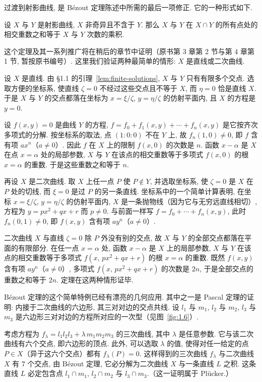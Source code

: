 过渡到射影曲线, 是 Bézout 定理陈述中所需的最后一项修正. 它的一种形式如下.

\begin{theorem}\label{thm:bezout-simple}
	设 $X$ 与 $Y$ 是射影曲线, $X$ 非奇异且不含于 $Y$. 那么 $X$ 与 $Y$ 在 $X \cap Y$ 的所有点处的相交重数之和等于 $X$ 与 $Y$ 次数的乘积.
\end{theorem}

这个定理及其一系列推广将在稍后的章节中证明（原书第 3 章第 2 节与第 4 章第 1 节, 暂按原书编号）. 这里我们验证两种最简单的情形: $X$ 是直线或二次曲线.

设 $X$ 是直线. 由 §1.1 的引理~\ref{lem:finite-solutions}, $X$ 与 $Y$ 只有有限多个交点. 选取方便的坐标系, 使直线 $\zeta = 0$ 不经过这些交点且不等于 $X$, 而 $\eta = 0$ 恰是直线 $X$. 于是 $X$ 与 $Y$ 的交点都落在坐标为 $x = \xi/\zeta$, $y = \eta/\zeta$ 的仿射平面内, 且 $X$ 的方程是 $y = 0$.

设 $f(x,y) = 0$ 是曲线 $Y$ 的方程, $f = f_0 + f_1(x,y) + \cdots + f_n(x,y)$ 是它按齐次多项式的分解. 按坐标系的取法, 点 $(1:0:0)$ 不在 $Y$ 上, 故 $f_n(1, 0) \ne 0$, 即 $f$ 含有项 $a x^n$（$a \ne 0$）. 因此 $f$ 在 $X$ 上的限制 $f(x, 0)$ 的次数是 $n$. 函数 $x - \alpha$ 是 $X$ 在点 $x = \alpha$ 处的局部参数, $X$ 与 $Y$ 在该点的相交重数等于多项式 $f(x, 0)$ 的根 $x = \alpha$ 的重数. 于是这些重数之和等于 $n$.

再设 $X$ 是二次曲线. 取 $X$ 上任一点 $P$ 使 $P \notin Y$, 并选取坐标系, 使 $\zeta = 0$ 是 $X$ 在 $P$ 处的切线, 而 $\xi = 0$ 是过 $P$ 的另一条直线. 坐标系中的一个简单计算表明, 在坐标 $x = \xi/\zeta$, $y = \eta/\zeta$ 的仿射平面内, $X$ 是一条抛物线（因为它与无穷远直线相切）, 方程为 $y = px^2 + qx + r$ 而 $p \ne 0$. 与前面一样写 $f = f_0 + \cdots + f_n(x,y)$, 此时 $f_n(0,1) \ne 0$, 即 $f(x,y)$ 含有项 $a y^n$（$a \ne 0$）.

二次曲线 $X$ 与直线 $\zeta = 0$ 除 $P$ 外没有别的交点, 故 $X$ 与 $Y$ 的全部交点都落在平面的有限部分. 在任一点 $x = \alpha$ 处, 函数 $x - \alpha$ 是 $X$ 上的局部参数, $X$ 与 $Y$ 在该点的相交重数等于多项式 $f(x,\, px^2 + qx + r)$ 的根 $x = \alpha$ 的重数. 既然 $f(x,y)$ 含有项 $a y^n$（$a \ne 0$）, 多项式 $f(x,\, px^2 + qx + r)$ 的次数是 $2n$, 于是全部交点的重数之和等于 $2n$. 定理在这两种情形证毕.

Bézout 定理的这个简单特例已经有漂亮的几何应用. 其中之一是 Pascal 定理的证明: 内接于二次曲线的六边形, 其三对对边的交点共线. 设 $l_1$ 与 $m_1$, $l_2$ 与 $m_2$, $l_3$ 与 $m_3$ 是六边形三对对边的方程所对应的一次型（见图~\ref{fig:1.6}）.

考虑方程为 $f_\lambda = l_1 l_2 l_3 + \lambda\, m_1 m_2 m_3$ 的三次曲线, 其中 $\lambda$ 是任意参数. 它与该二次曲线有六个交点, 即六边形的顶点. 此外, 可以选取 $\lambda$ 的值, 使得对任一给定的点 $P \in X$（异于这六个交点）都有 $f_\lambda(P) = 0$. 这样得到的三次曲线 $f_\lambda$ 与二次曲线 $X$ 有 $7$ 个交点, 由 Bézout 定理, 它必分解为二次曲线 $X$ 与一条直线 $L$ 之积. 这条直线 $L$ 必定包含点 $l_1 \cap m_1$, $l_2 \cap m_2$ 与 $l_3 \cap m_3$.（这一证明属于 Plücker.）

